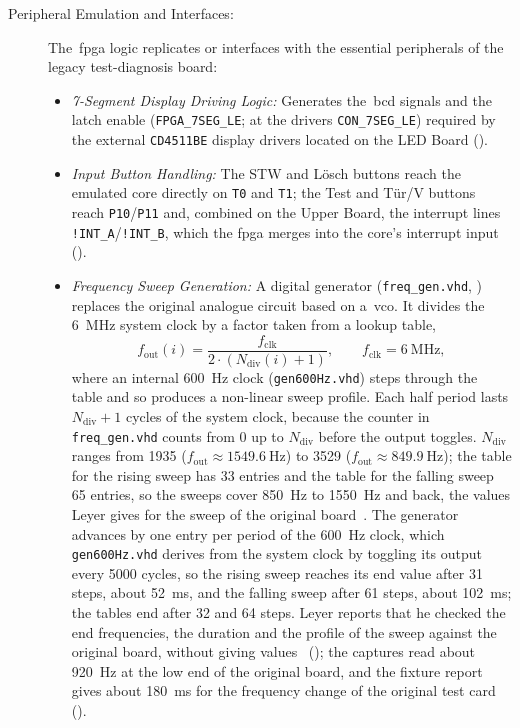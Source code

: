 \begin{description}
	\item[Peripheral Emulation and Interfaces:] The~\gls{fpga} logic replicates or interfaces with the essential peripherals of the legacy test-diagnosis board:
	      \begin{itemize}
		      \item \textit{7-Segment Display Driving Logic:} Generates the~\gls{bcd} signals and the latch enable (\texttt{FPGA\_7SEG\_LE}; at the drivers \texttt{CON\_7SEG\_LE}) required by the external \texttt{CD4511BE} display drivers located on the LED Board ().
		      \item \textit{Input Button Handling:} The STW and Lösch buttons reach the emulated core directly on \texttt{T0} and \texttt{T1}; the Test and Tür/V buttons reach \texttt{P10}/\texttt{P11} and, combined on the Upper Board, the interrupt lines \texttt{!INT\_A}/\texttt{!INT\_B}, which the \gls{fpga} merges into the core's interrupt input~\cite{leyer2023} ().
		      \item \textit{Frequency Sweep Generation:} A digital generator (\texttt{freq\_gen.vhd}, ) replaces the original analogue circuit based on a~\gls{vco}. It divides the \SI{6}{\mega\hertz} system clock by a factor taken from a lookup table,
		      \begin{equation}
			      f_\mathrm{out}(i) = \frac{f_\mathrm{clk}}{2 \cdot (N_\mathrm{div}(i) + 1)}, \qquad f_\mathrm{clk} = \SI{6}{\mega\hertz},
			      \label{eq:sweep}
		      \end{equation}
		      where an internal \SI{600}{\hertz} clock (\texttt{gen600Hz.vhd}) steps through the table and so produces a non-linear sweep profile. Each half period lasts $N_\mathrm{div} + 1$ cycles of the system clock, because the counter in \texttt{freq\_gen.vhd} counts from 0 up to $N_\mathrm{div}$ before the output toggles. $N_\mathrm{div}$ ranges from 1935 ($f_\mathrm{out} \approx \SI{1549.6}{\hertz}$) to 3529 ($f_\mathrm{out} \approx \SI{849.9}{\hertz}$); the table for the rising sweep has 33 entries and the table for the falling sweep 65 entries, so the sweeps cover \SI{850}{\hertz} to \SI{1550}{\hertz} and back, the values Leyer gives for the sweep of the original board~\cite[Sec.~2.9]{leyer2023}. The generator advances by one entry per period of the \SI{600}{\hertz} clock, which \texttt{gen600Hz.vhd} derives from the system clock by toggling its output every 5000 cycles, so the rising sweep reaches its end value after 31 steps, about \SI{52}{\milli\second}, and the falling sweep after 61 steps, about \SI{102}{\milli\second}; the tables end after 32 and 64 steps. Leyer reports that he checked the end frequencies, the duration and the profile of the sweep against the original board, without giving values~\cite[Sec.~4.10]{leyer2023} (); the captures read about \SI{920}{\hertz} at the low end of the original board, and the fixture report gives about \SI{180}{\milli\second} for the frequency change of the original test card ().

\end{itemize}
\end{description}
